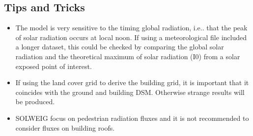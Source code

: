 \documentclass[letterpaper,10pt,english]{sphinxmanual}
\begin{document}
\subsection{Tips and Tricks}
\label{\detokenize{OtherManuals/SOLWEIG:tips-and-tricks}}\begin{itemize}
\item {} 
The model is very sensitive to the timing global radiation, i.e..
that the peak of solar radiation occurs at local noon. If using a
meteorological file included a longer dataset, this could be checked
by comparing the global solar radiation and the theoretical maximum
of solar radiation (I0) from a solar exposed point of interest.

\item {} 
If using the land cover grid to derive the building grid, it is
important that it coincides with the ground and building DSM.
Otherwise strange results will be produced.

\item {} 
SOLWEIG focus on pedestrian radiation fluxes and it is not
recommended to consider fluxes on building roofs.

\end{itemize}
\end{document}

